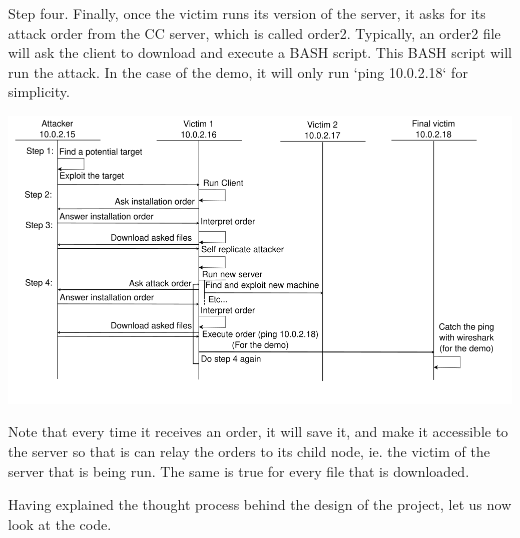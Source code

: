\documentclass[../main.tex]{subfiles}
\begin{document}
    Step four.
    Finally, once the victim runs its version of the server, it asks for its attack order from the CC server, which is called order2.
    Typically, an order2 file will ask the client to download and execute a BASH script.
    This BASH script will run the attack.
    In the case of the demo, it will only run `ping 10.0.2.18` for simplicity.

    \includegraphics[width=450pt]{botnet_flow.png}

    Note that every time it receives an order, it will save it, and make it accessible to the server so that is can relay the orders to its child node, ie. the victim of the server that is being run.
    The same is true for every file that is downloaded.

    Having explained the thought process behind the design of the project, let us now look at the code.
\end{document}
